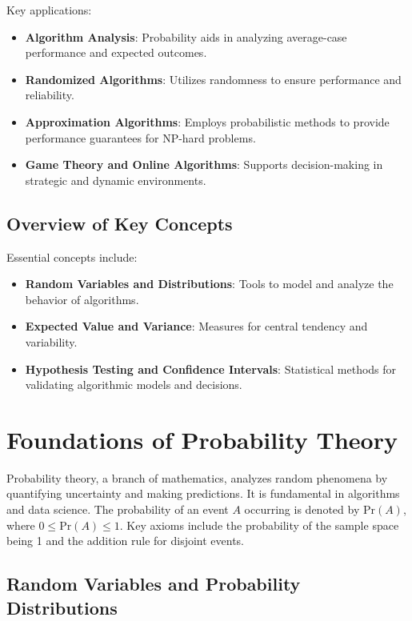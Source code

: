 \documentclass[12pt]{book} %
\begin{document}
Key applications:
\begin{itemize}
    \item \textbf{Algorithm Analysis}: Probability aids in analyzing average-case performance and expected outcomes.
    \item \textbf{Randomized Algorithms}: Utilizes randomness to ensure performance and reliability.
    \item \textbf{Approximation Algorithms}: Employs probabilistic methods to provide performance guarantees for NP-hard problems.
    \item \textbf{Game Theory and Online Algorithms}: Supports decision-making in strategic and dynamic environments.
\end{itemize}

\subsection{Overview of Key Concepts}

Essential concepts include:
\begin{itemize}
    \item \textbf{Random Variables and Distributions}: Tools to model and analyze the behavior of algorithms.
    \item \textbf{Expected Value and Variance}: Measures for central tendency and variability.
    \item \textbf{Hypothesis Testing and Confidence Intervals}: Statistical methods for validating algorithmic models and decisions.
\end{itemize}


\section{Foundations of Probability Theory}

Probability theory, a branch of mathematics, analyzes random phenomena by quantifying uncertainty and making predictions. It is fundamental in algorithms and data science. The probability of an event \(A\) occurring is denoted by \(\text{Pr}(A)\), where \(0 \leq \text{Pr}(A) \leq 1\). Key axioms include the probability of the sample space being 1 and the addition rule for disjoint events.

\subsection{Random Variables and Probability Distributions}
\end{document}
